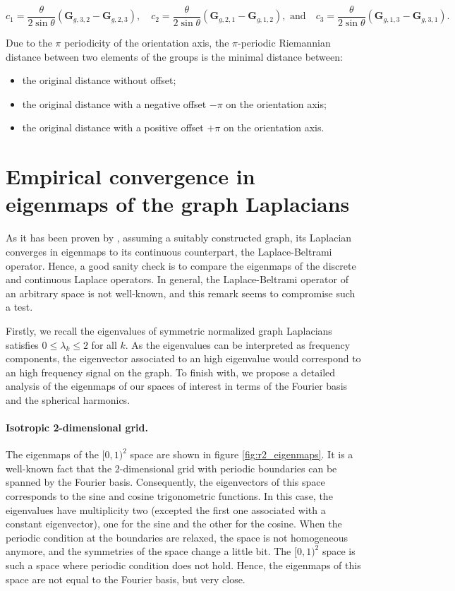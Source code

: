 \documentclass{article}
\begin{document}
\begin{equation}
c_1 = \frac{\theta}{2 \sin \theta} ( \boldsymbol{G}_{g, 3, 2} - \boldsymbol{G}_{g, 2, 3})
, \quad
c_2 = \frac{\theta}{2 \sin \theta} ( \boldsymbol{G}_{g, 2, 1} - \boldsymbol{G}_{g, 1, 2})
, \text{ and} \quad
c_3 = \frac{\theta}{2 \sin \theta} ( \boldsymbol{G}_{g, 1, 3} - \boldsymbol{G}_{g, 3, 1}).
\end{equation}

Due to the $\pi$ periodicity of the orientation axis, the $\pi$-periodic Riemannian distance between two elements of the groups is the minimal distance between:
\begin{itemize}
\item the original distance without offset;
\item the original distance with a negative offset $-\pi$ on the orientation axis;
\item the original distance with a positive offset $+\pi$ on the orientation axis.
\end{itemize}

\clearpage
\section{Empirical convergence in eigenmaps of the graph Laplacians} \label{app:laplacian}

As it has been proven by \cite{belkin2006convergence}, assuming a suitably constructed graph, its Laplacian converges in eigenmaps to its continuous counterpart, the Laplace-Beltrami operator. Hence, a good sanity check is to compare the eigenmaps of the discrete and continuous Laplace operators. In general, the Laplace-Beltrami operator of an arbitrary space is not well-known, and this remark seems to compromise such a test. 

Firstly, we recall the eigenvalues of symmetric normalized graph Laplacians satisfies $0 \leq \lambda_k \leq 2$ for all $k$. As the eigenvalues can be interpreted as frequency components, the eigenvector associated to an high eigenvalue would correspond to an high frequency signal on the graph. To finish with, we propose a detailed analysis of the eigenmaps of our spaces of interest in terms of the Fourier basis and the spherical harmonics.

\paragraph{Isotropic 2-dimensional grid.} The eigenmaps of the $[0,1)^2$ space are shown in figure \ref{fig:r2_eigenmaps}. It is a well-known fact that the 2-dimensional grid with periodic boundaries can be spanned by the Fourier basis. Consequently, the eigenvectors of this space corresponds to the sine and cosine trigonometric functions. In this case, the eigenvalues have multiplicity two (excepted the first one associated with a constant eigenvector), one for the sine and the other for the cosine. When the periodic condition at the boundaries are relaxed, the space is not homogeneous anymore, and the symmetries of the space change a little bit. The $[0,1)^2$ space is such a space where periodic condition does not hold. Hence, the eigenmaps of this space are not equal to the Fourier basis, but very close. 
\end{document}
